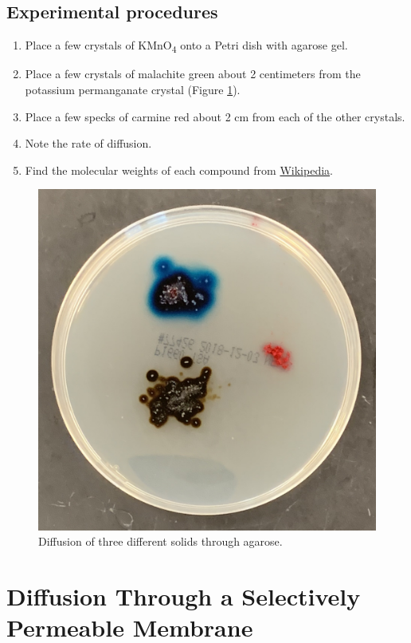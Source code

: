 \subsection{Experimental procedures}\label{experimental-procedures-15}

\begin{enumerate}
\def\labelenumi{\arabic{enumi}.}
\tightlist
\item
  Place a few crystals of KMnO\textsubscript{4} onto a Petri dish with
  agarose gel.
\item
  Place a few crystals of malachite green about 2 centimeters from the
  potassium permanganate crystal (Figure \ref{fig:solid}).
\item
  Place a few specks of carmine red about 2 cm from each of the other
  crystals.
\item
  Note the rate of diffusion.
\item
  Find the molecular weights of each compound from
  \href{https://www.wikipedia.org}{Wikipedia}.
\end{enumerate}

\begin{figure}

{\centering \includegraphics[width=0.7\linewidth]{./figures/exchange/solid_diffusion} 

}

\caption{Diffusion of three different solids through agarose.}\label{fig:solid}
\end{figure}

\section{Diffusion Through a Selectively Permeable
Membrane}\label{diffusion-through-a-selectively-permeable-membrane}


